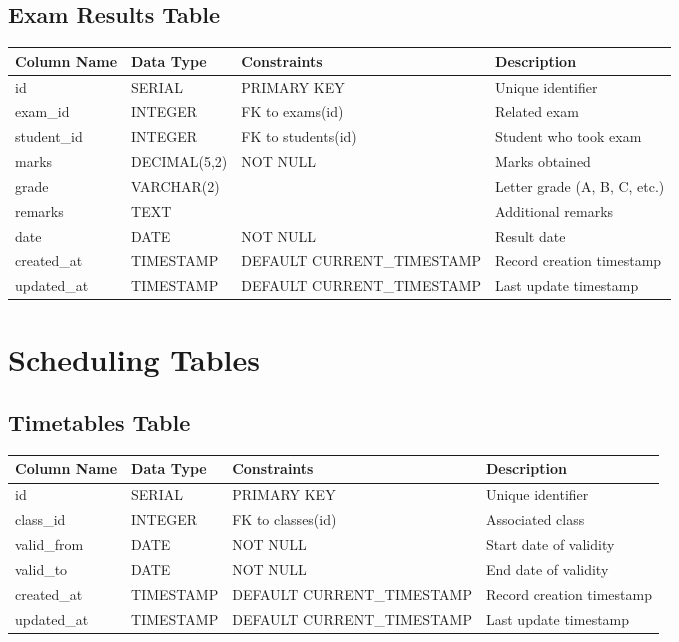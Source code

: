 \documentclass[11pt,a4paper]{article}
\begin{document}
\subsection{Exam Results Table}
\begin{longtable}{|p{3.5cm}|p{2.5cm}|p{3cm}|p{5.5cm}|}
\hline
\textbf{Column Name} & \textbf{Data Type} & \textbf{Constraints} & \textbf{Description} \\
\hline
\endhead
id & SERIAL & PRIMARY KEY & Unique identifier \\
\hline
exam\_id & INTEGER & FK to exams(id) & Related exam \\
\hline
student\_id & INTEGER & FK to students(id) & Student who took exam \\
\hline
marks & DECIMAL(5,2) & NOT NULL & Marks obtained \\
\hline
grade & VARCHAR(2) & & Letter grade (A, B, C, etc.) \\
\hline
remarks & TEXT & & Additional remarks \\
\hline
date & DATE & NOT NULL & Result date \\
\hline
created\_at & TIMESTAMP & DEFAULT CURRENT\_TIMESTAMP & Record creation timestamp \\
\hline
updated\_at & TIMESTAMP & DEFAULT CURRENT\_TIMESTAMP & Last update timestamp \\
\hline
\end{longtable}

\section{Scheduling Tables}

\subsection{Timetables Table}
\begin{longtable}{|p{3.5cm}|p{2.5cm}|p{3cm}|p{5.5cm}|}
\hline
\textbf{Column Name} & \textbf{Data Type} & \textbf{Constraints} & \textbf{Description} \\
\hline
\endhead
id & SERIAL & PRIMARY KEY & Unique identifier \\
\hline
class\_id & INTEGER & FK to classes(id) & Associated class \\
\hline
valid\_from & DATE & NOT NULL & Start date of validity \\
\hline
valid\_to & DATE & NOT NULL & End date of validity \\
\hline
created\_at & TIMESTAMP & DEFAULT CURRENT\_TIMESTAMP & Record creation timestamp \\
\hline
updated\_at & TIMESTAMP & DEFAULT CURRENT\_TIMESTAMP & Last update timestamp \\
\hline
\end{longtable}
\end{document}
